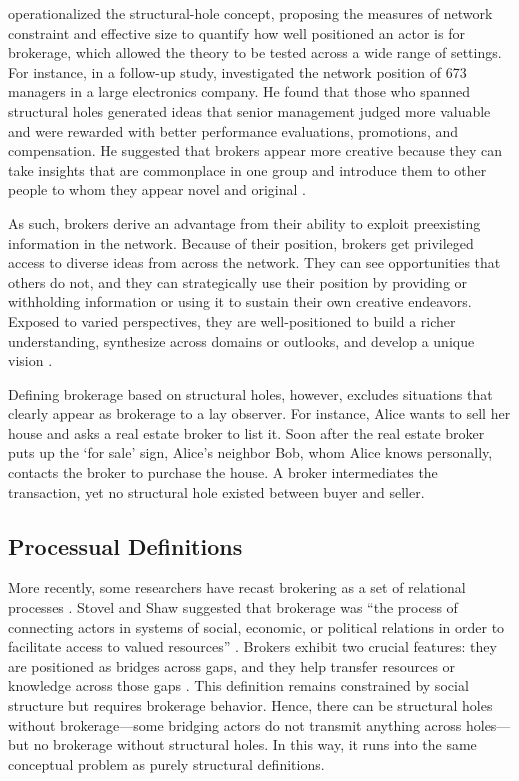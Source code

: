 \documentclass[
]{article}
\begin{document}
\textcite{burtStructuralHolesSocial1992} operationalized the structural-hole concept, proposing the measures of network constraint and effective size to quantify how well positioned an actor is for brokerage, which allowed the theory to be tested across a wide range of settings. For instance, in a follow-up study, \textcite{burtStructuralHolesGood2004} investigated the network position of 673 managers in a large electronics company. He found that those who spanned structural holes generated ideas that senior management judged more valuable and were rewarded with better performance evaluations, promotions, and compensation. He suggested that brokers appear more creative because they can take insights that are commonplace in one group and introduce them to other people to whom they appear novel and original \autocite[388]{burtStructuralHolesGood2004}.

As such, brokers derive an advantage from their ability to exploit preexisting information in the network. Because of their position, brokers get privileged access to diverse ideas from across the network. They can see opportunities that others do not, and they can strategically use their position by providing or withholding information \autocite{burtStructuralHolesSocial1992} or using it to sustain their own creative endeavors. Exposed to varied perspectives, they are well-positioned to build a richer understanding, synthesize across domains or outlooks, and develop a unique vision \autocite{burtStructuralHolesGood2004}.

Defining brokerage based on structural holes, however, excludes situations that clearly appear as brokerage to a lay observer. For instance, Alice wants to sell her house and asks a real estate broker to list it. Soon after the real estate broker puts up the `for sale' sign, Alice's neighbor Bob, whom Alice knows personally, contacts the broker to purchase the house. A broker intermediates the transaction, yet no structural hole existed between buyer and seller.

\subsection{Processual Definitions}

More recently, some researchers have recast brokering as a set of relational processes \autocite{obstfeldBrokerageProcessDecoupling2014,rossmanObfuscatoryRelationalWork2014,spiroExtendedStructuresMediation2013,stovelBrokerage2012}. Stovel and Shaw suggested that brokerage was ``the process of connecting actors in systems of social, economic, or political relations in order to facilitate access to valued resources'' \autocites[141]{stovelBrokerage2012}[see also][]{stovelStabilizingBrokerage2011}. Brokers exhibit two crucial features: they are positioned as bridges across gaps, and they help transfer resources or knowledge across those gaps \autocite[141]{stovelBrokerage2012}. This definition remains constrained by social structure but requires brokerage behavior. Hence, there can be structural holes without brokerage---some bridging actors do not transmit anything across holes---but no brokerage without structural holes. In this way, it runs into the same conceptual problem as purely structural definitions.
\end{document}
